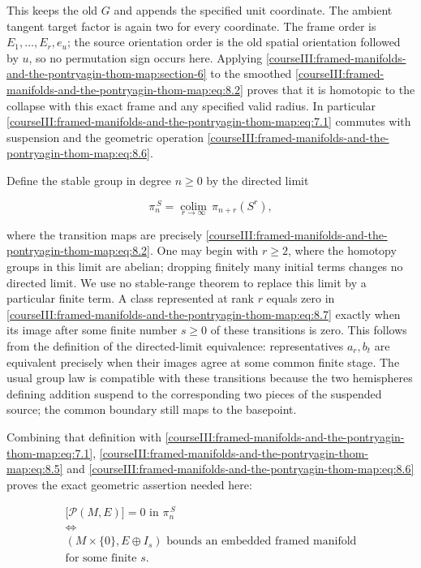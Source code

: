 This keeps the old \(G\) and appends the specified unit coordinate. The ambient tangent target factor is again two for every coordinate. The frame order is \(E_1,\ldots,E_r,e_u\); the source orientation order is the old spatial orientation followed by \(u\), so no permutation sign occurs here. Applying \cref{courseIII:framed-manifolds-and-the-pontryagin-thom-map:section-6} to the smoothed \eqref{courseIII:framed-manifolds-and-the-pontryagin-thom-map:eq:8.2} proves that it is homotopic to the collapse with this exact frame and any specified valid radius. In particular \eqref{courseIII:framed-manifolds-and-the-pontryagin-thom-map:eq:7.1} commutes with suspension and the geometric operation \eqref{courseIII:framed-manifolds-and-the-pontryagin-thom-map:eq:8.6}.

Define the stable group in degree \(n\geq0\) by the directed limit

\begin{equation}
\pi_n^{\,S}=\underset{r\longrightarrow\infty}{\operatorname{colim}}\,
                   \pi_{n+r}(S^r),
 \label{courseIII:framed-manifolds-and-the-pontryagin-thom-map:eq:8.7}
\end{equation}

where the transition maps are precisely \eqref{courseIII:framed-manifolds-and-the-pontryagin-thom-map:eq:8.2}. One may begin with \(r\geq2\), where the homotopy groups in this limit are abelian; dropping finitely many initial terms changes no directed limit. We use no stable-range theorem to replace this limit by a particular finite term. A class represented at rank \(r\) equals zero in \eqref{courseIII:framed-manifolds-and-the-pontryagin-thom-map:eq:8.7} exactly when its image after some finite number \(s\geq0\) of these transitions is zero. This follows from the definition of the directed-limit equivalence: representatives \(a_r,b_t\) are equivalent precisely when their images agree at some common finite stage. The usual group law is compatible with these transitions because the two hemispheres defining addition suspend to the corresponding two pieces of the suspended source; the common boundary still maps to the basepoint.

Combining that definition with \eqref{courseIII:framed-manifolds-and-the-pontryagin-thom-map:eq:7.1}, \eqref{courseIII:framed-manifolds-and-the-pontryagin-thom-map:eq:8.5} and \eqref{courseIII:framed-manifolds-and-the-pontryagin-thom-map:eq:8.6} proves the exact geometric assertion needed here:

\begin{equation}
\begin{gathered}
 \bigl[\mathcal P(M,E)\bigr]=0\text{ in }\pi_n^{\,S}
 \\
 \Longleftrightarrow
 \\
 (M\times\{0\},E\oplus I_s)
 \text{ bounds an embedded framed manifold}
 \\
 \text{for some finite }s.
 \end{gathered}
 \label{courseIII:framed-manifolds-and-the-pontryagin-thom-map:eq:8.8}
\end{equation}

